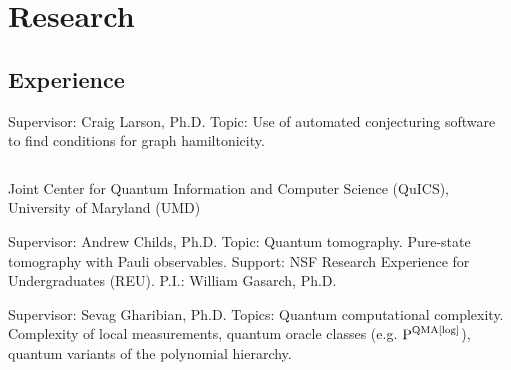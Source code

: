 \documentclass[11pt,letterpaper,serif]{moderncv}
\begin{document}

\section{Research}
\subsection{Experience}
{	
	\begin{adjustwidth}{.25in}{}
		Supervisor: Craig Larson, Ph.D. \newline
		Topic: Use of automated conjecturing software to find conditions for graph hamiltonicity.
	\end{adjustwidth}
}

{
	$\!$\begin{minipage}{0.8\textwidth}
		Joint Center for Quantum Information and Computer Science (QuICS), \newline
		University of Maryland (UMD)	
	\end{minipage}
}
{}{}
{	
	\begin{adjustwidth}{.25in}{}
		Supervisor: Andrew Childs, Ph.D. \newline
		Topic: Quantum tomography. Pure-state tomography with Pauli observables. \newline
		Support: NSF Research Experience for Undergraduates (REU). P.I.: William Gasarch, Ph.D.
	\end{adjustwidth}
}

{	
	\begin{adjustwidth}{.25in}{}
		Supervisor: Sevag Gharibian, Ph.D. \newline
		Topics: Quantum computational complexity. Complexity of local measurements, quantum oracle classes (e.g. $\textup{P}^{\textup{QMA[log]}}$), quantum variants of the polynomial hierarchy.
	\end{adjustwidth}
}
\end{document}
